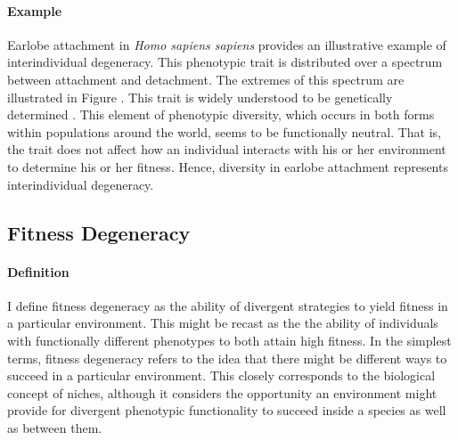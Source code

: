 \paragraph{Example}
Earlobe attachment in \textit{Homo sapiens sapiens} provides an illustrative example of interindividual degeneracy. This phenotypic trait is distributed over a spectrum between attachment and detachment. The extremes of this spectrum are illustrated in Figure . This trait is widely understood to be genetically determined \cite{Dutta1979EarlobeAssam}. This element of phenotypic diversity, which occurs in both forms within populations around the world, seems to be functionally neutral. That is, the trait does not affect how an individual interacts with his or her environment to determine his or her fitness. Hence, diversity in earlobe attachment represents interindividual degeneracy.

\subsection{Fitness Degeneracy}

\paragraph{Definition}
I define fitness degeneracy as the ability of divergent strategies to yield fitness in a particular environment. This might be recast as the the ability of individuals with functionally different phenotypes to both attain high fitness. In the simplest terms, fitness degeneracy refers to the idea that there might be different ways to succeed in a particular environment. This closely corresponds to the biological concept of niches, although it considers the opportunity an environment might provide for divergent phenotypic functionality to succeed inside a species as well as between them.

